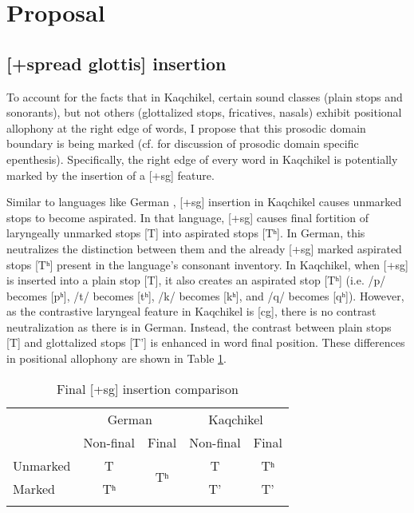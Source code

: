 \documentclass[output=paper,colorlinks,citecolor=brown]{langscibook}
\begin{document}
\section{Proposal}\label{Proposal}
\subsection{[+spread glottis] insertion}\label{[spread glottis] insertion}
To account for the facts that in Kaqchikel, certain sound classes (plain stops and sonorants), but not others (glottalized stops, fricatives, nasals) exhibit positional allophony at the right edge of words, I propose that this prosodic domain boundary is being marked (cf.  for discussion of prosodic domain specific epenthesis). Specifically, the right edge of every word in Kaqchikel is potentially marked by the insertion of a [+sg] feature.

Similar to languages like German \citep{iverson_salmons_2007}, [+sg] insertion in Kaqchikel causes unmarked stops to become aspirated. In that language, [+sg] causes final fortition of laryngeally unmarked stops [T] into aspirated stops [Tʰ]. In German, this neutralizes the distinction between them and the already [+sg] marked aspirated stops [Tʰ] present in the language’s consonant inventory. In Kaqchikel, when [+sg] is inserted into a plain stop [T], it also creates an aspirated stop [Tʰ] (i.e. /p/ becomes [pʰ], /t/ becomes [tʰ], /k/ becomes [kʰ], and /q/ becomes [qʰ]). However, as the contrastive laryngeal feature in Kaqchikel is [cg], there is no contrast neutralization as there is in German. Instead, the contrast between plain stops [T] and glottalized stops [T’] is enhanced in word final position. These differences in positional allophony are shown in Table \ref{insertions}.

\begin{table}
\caption{Final [+sg] insertion comparison}
\label{insertions}
 \begin{tabular}{l cccc}
  \lsptoprule
        &    \multicolumn{2}{c}{German}   &    \multicolumn{2}{c}{Kaqchikel} \\\cmidrule(lr){2-3}\cmidrule(lr){4-5}
                &    Non-final   &   Final   &   Non-final  &   Final\\\midrule
    Unmarked    &   T   &   \multirow{2}{*}{Tʰ} &   T   &   Tʰ  \\
    Marked      &   Tʰ  &                       &   T’  &   T’  \\
  \lspbottomrule
 \end{tabular}
\end{table}
\end{document}

